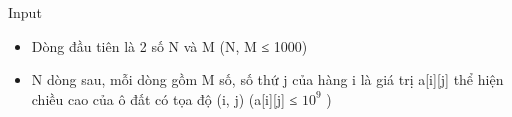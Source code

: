 Input
\begin{itemize}
	\item Dòng đầu tiên là 2 số N và M (N, M ≤ 1000)
	\item N dòng sau, mỗi dòng gồm M số, số thứ j của hàng i là giá trị a[i][j] thể hiện chiều cao của ô đất có tọa độ (i, j) (a[i][j] ≤ $10^{9}$ )
\end{itemize}